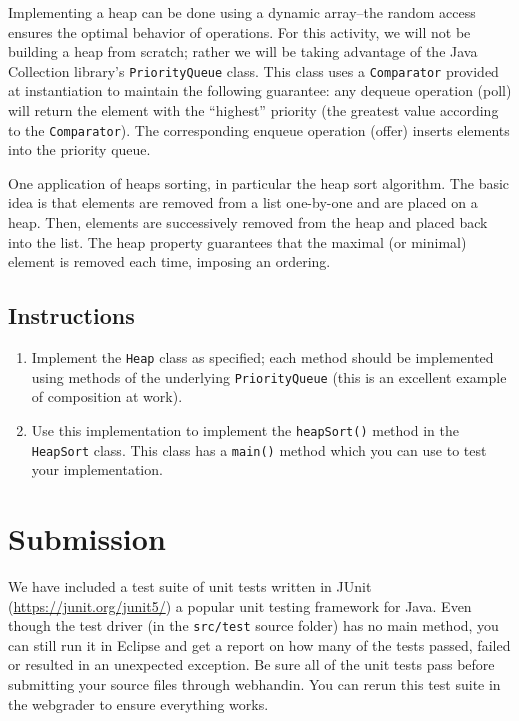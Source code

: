 \documentclass[12pt]{scrartcl}
\begin{document}
Implementing a heap can be done using a dynamic array--the random 
access ensures the optimal behavior of operations.  For this 
activity, we will not be building a heap from scratch; rather we 
will be taking advantage of the Java Collection library's 
\texttt{PriorityQueue} class.  This class uses a 
\texttt{Comparator} provided at instantiation to maintain 
the following guarantee: any dequeue operation (poll) will return 
the element with the ``highest'' priority (the greatest value 
according to the \texttt{Comparator}).  The corresponding 
enqueue operation (offer) inserts elements into the priority queue.

One application of heaps sorting, in particular the heap sort 
algorithm.  The basic idea is that elements are removed from a 
list one-by-one and are placed on a heap.  Then, elements are 
successively removed from the heap and placed back into the list.  
The heap property guarantees that the maximal (or minimal) element 
is removed each time, imposing an ordering.

\subsection*{Instructions}

\begin{enumerate}
  \item Implement the \texttt{Heap} class as specified; 
    each method should be implemented using methods of the 
    underlying \texttt{PriorityQueue} (this is an
    excellent example of composition at work).
  \item Use this implementation to implement the 
    \texttt{heapSort()} method in the 
    \texttt{HeapSort} class.  This class has a 
    \texttt{main()} method which you can use to test 
    your implementation.
\end{enumerate}
    
\section*{Submission}

We have included a test suite of unit tests written in JUnit 
(\url{https://junit.org/junit5/}) a popular unit testing framework for
Java.  Even though the test driver (in the \texttt{src/test}
source folder) has no main method, you can still run it in Eclipse and
get a report on how many of the tests passed, failed or resulted in 
an unexpected exception.  Be sure all of the unit tests pass before
submitting your source files through webhandin.  You can rerun this
test suite in the webgrader to ensure everything works.  
\end{document}
